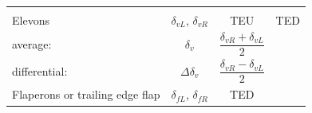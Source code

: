 \documentclass[
]{book}
\begin{document}
\begin{longtable}[]{@{}lccc@{}}
\begin{minipage}[t]{0.27\columnwidth}
\strut
\end{minipage}\tabularnewline
\begin{minipage}[t]{0.19\columnwidth}\raggedright
Elevons\strut
\end{minipage} & \begin{minipage}[t]{0.14\columnwidth}\centering
\(\delta_{vL}\),
\(\delta_{vR}\)\strut
\end{minipage} & \begin{minipage}[t]{0.29\columnwidth}\centering
TEU\strut
\end{minipage} & \begin{minipage}[t]{0.27\columnwidth}\centering
TED\strut
\end{minipage}\tabularnewline
\begin{minipage}[t]{0.19\columnwidth}\raggedright
average:\strut
\end{minipage} & \begin{minipage}[t]{0.14\columnwidth}\centering
\(\delta_v\)\strut
\end{minipage} & \begin{minipage}[t]{0.29\columnwidth}\centering
\[\frac{\delta_{vR} + \delta_{vL}}{2}\]\strut
\end{minipage} & \begin{minipage}[t]{0.27\columnwidth}\centering
\strut
\end{minipage}\tabularnewline
\begin{minipage}[t]{0.19\columnwidth}\raggedright
differential:\strut
\end{minipage} & \begin{minipage}[t]{0.14\columnwidth}\centering
\(\Delta\delta_v\)\strut
\end{minipage} & \begin{minipage}[t]{0.29\columnwidth}\centering
\[\frac{\delta_{vR} - \delta_{vL}}{2}\]\strut
\end{minipage} & \begin{minipage}[t]{0.27\columnwidth}\centering
\strut
\end{minipage}\tabularnewline
\begin{minipage}[t]{0.19\columnwidth}\raggedright
Flaperons or trailing edge flap\strut
\end{minipage} & \begin{minipage}[t]{0.14\columnwidth}\centering
\(\delta_{fL}\),
\(\delta_{fR}\)\strut
\end{minipage} & \begin{minipage}[t]{0.29\columnwidth}\centering
TED\strut
\end{minipage} & \begin{minipage}[t]{0.27\columnwidth}\centering

\end{minipage}
\end{longtable}
\end{document}
